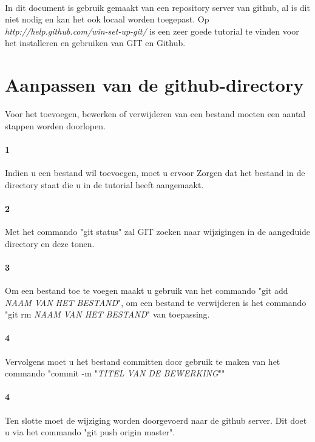 \documentclass[12pt,a4paper]{report}
\begin{document}
\begin{flushleft}
\paragraph*{}
In dit document is gebruik gemaakt van een repository server van github, al is dit niet nodig en kan het ook locaal worden toegepast.
Op \textit{http://help.github.com/win-set-up-git/} is een zeer goede tutorial te vinden voor het installeren en gebruiken van GIT en Github.
\section*{Aanpassen van de github-directory}
Voor het toevoegen, bewerken of verwijderen van een bestand moeten een aantal stappen worden doorlopen.
\paragraph*{1}
Indien u een bestand wil toevoegen, moet u ervoor Zorgen dat het bestand in de directory staat die u in de tutorial heeft aangemaakt.
\paragraph*{2}
Met het commando "git status" zal GIT zoeken naar wijzigingen in de aangeduide directory en deze tonen.
\paragraph*{3}
Om een bestand toe te voegen maakt u gebruik van het commando "git add \textit{NAAM VAN HET BESTAND}", om een bestand te verwijderen is het commando "git rm \emph{NAAM VAN HET BESTAND}" van toepassing.
\paragraph*{4}
Vervolgens moet u het bestand committen door gebruik te maken van het commando "commit -m "\textit{TITEL VAN DE BEWERKING}""
\paragraph*{4}
Ten slotte moet de wijziging worden doorgevoerd naar de github server. Dit doet u via het commando "git push origin master".
\end{flushleft}
\end{document}
